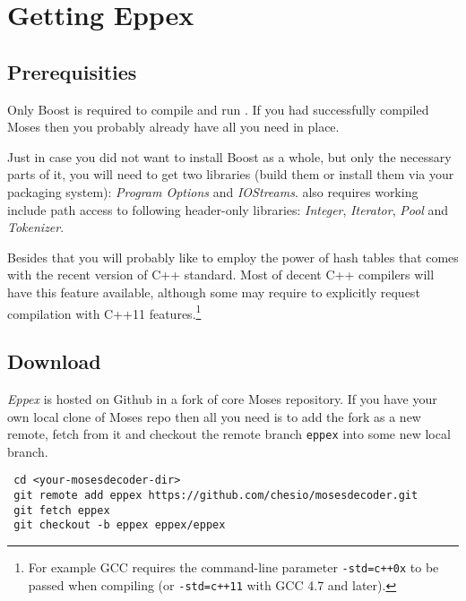 \chapter{Getting Eppex}
\label{chap:installation}


\section{Prerequisities}

Only Boost is required to compile and run \eppex{}.
If you had successfully compiled Moses then you probably already have all you need in place.

Just in case you did not want to install Boost as a whole, but only the necessary
parts of it, you will need to get two libraries (build them or install
them via your packaging system): \emph{Program Options} and \emph{IOStreams}.
\Eppex{} also requires working include path access to following
header-only libraries: \emph{Integer}, \emph{Iterator}, \emph{Pool} and \emph{Tokenizer}.

Besides that you will probably like to employ the power of hash tables
that comes with the recent version of C++ standard.
Most of decent C++ compilers will have this feature available,
although some may require to explicitly request compilation with C++11
features.\footnote{For example GCC requires the command-line parameter
\texttt{-std=c++0x} to be passed when compiling (or \texttt{-std=c++11}
with GCC 4.7 and later).}

\section{Download}

\emph{Eppex} is hosted on Github in
a fork
of core Moses repository.
If you have your own local clone of Moses repo then all you need is to add
the fork as a new remote, fetch from it and checkout the remote branch
\texttt{eppex} into some new local branch.
\begin{verbatim}
 cd <your-mosesdecoder-dir>
 git remote add eppex https://github.com/chesio/mosesdecoder.git
 git fetch eppex
 git checkout -b eppex eppex/eppex
\end{verbatim}

